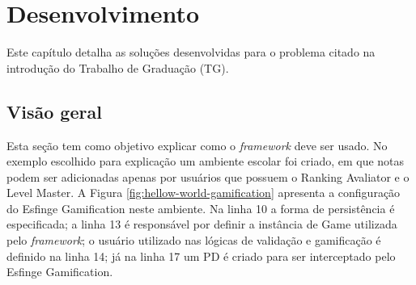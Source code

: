 \newpage
\chapter{Desenvolvimento}
\label{ch:desenvolvimento}




\par Este capítulo detalha as soluções desenvolvidas para o problema citado na introdução do Trabalho de Graduação (TG).

\section{Visão geral}

\par Esta seção tem como objetivo explicar como o \textit{framework} deve ser usado. No exemplo escolhido para explicação um ambiente escolar foi criado, em que notas podem ser adicionadas apenas por usuários que possuem o Ranking Avaliator e o Level Master. A Figura \ref{fig:hellow-world-gamification} apresenta a configuração do Esfinge Gamification neste ambiente. Na linha 10 a forma de persistência é especificada; a linha 13 é responsável por definir a instância de Game utilizada pelo \textit{framework}; o usuário utilizado nas lógicas de validação e gamificação é definido na linha 14; já na linha 17 um PD é criado para ser interceptado pelo Esfinge Gamification.


